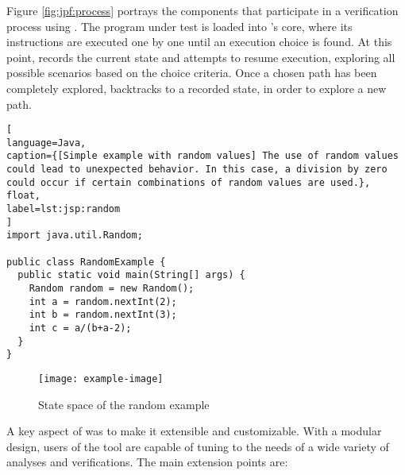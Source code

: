 Figure \ref{fig:jpf:process} portrays the components that participate in a verification process using \jpf. The program under test is loaded into \jpf's core, where its instructions are executed one by one until an execution choice is found. At this point, \jpf records the current state and attempts to resume execution, exploring all possible scenarios based on the choice criteria. Once a chosen path has been completely explored, \jpf backtracks to a recorded state, in order to explore a new path.

\begin{lstlisting}[
language=Java,
caption={[Simple example with random values] The use of random values could lead to unexpected behavior. In this case, a division by zero could occur if certain combinations of random values are used.},
float,
label=lst:jsp:random
]
import java.util.Random;

public class RandomExample {
  public static void main(String[] args) {
    Random random = new Random();
    int a = random.nextInt(2);
    int b = random.nextInt(3);
    int c = a/(b+a-2);
  }
}
\end{lstlisting}


\begin{figure}[t]
\centering
\texttt{[image: example-image]}
\caption{State space of the random example}
\label{fig:jpf:random}
\end{figure}

A key aspect of \jpf was to make it extensible and customizable. With a modular design, users of the tool are capable of tuning \jpf to the needs of a wide variety of analyses and verifications. The main extension points are:

